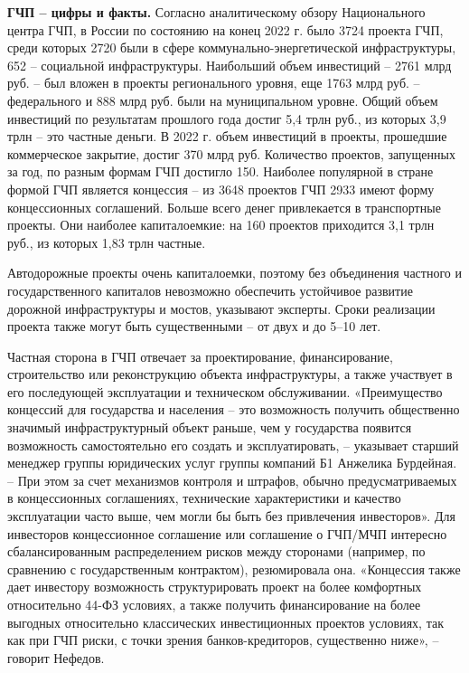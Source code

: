 \begin{fancyquotes}
    \textbf{ГЧП – цифры и факты.} Согласно аналитическому обзору Национального центра ГЧП, в России по состоянию на конец 2022 г. было 3724 проекта ГЧП, среди которых 2720 были в сфере коммунально-энергетической инфраструктуры, 652 – социальной инфраструктуры. Наибольший объем инвестиций – 2761 млрд руб. – был вложен в проекты регионального уровня, еще 1763 млрд руб. – федерального и 888 млрд руб. были на муниципальном уровне. Общий объем инвестиций по результатам прошлого года достиг 5,4 трлн руб., из которых 3,9 трлн – это частные деньги.
    В 2022 г. объем инвестиций в проекты, прошедшие коммерческое закрытие, достиг 370 млрд руб. Количество проектов, запущенных за год, по разным формам ГЧП достигло 150.
    Наиболее популярной в стране формой ГЧП является концессия – из 3648 проектов ГЧП 2933 имеют форму концессионных соглашений. Больше всего денег привлекается в транспортные проекты. Они наиболее капиталоемкие: на 160 проектов приходится 3,1 трлн руб., из которых 1,83 трлн частные.
\end{fancyquotes}



Автодорожные проекты очень капиталоемки, поэтому без объединения частного и государственного капиталов невозможно обеспечить устойчивое развитие дорожной инфраструктуры и мостов, указывают эксперты. Сроки реализации проекта также могут быть существенными – от двух и до 5–10 лет.

Частная сторона в ГЧП отвечает за проектирование, финансирование, строительство или реконструкцию объекта инфраструктуры, а также участвует в его последующей эксплуатации и техническом обслуживании. «Преимущество концессий для государства и населения – это возможность получить общественно значимый инфраструктурный объект раньше, чем у государства появится возможность самостоятельно его создать и эксплуатировать, – указывает старший менеджер группы юридических услуг группы компаний Б1 Анжелика Бурдейная. – При этом за счет механизмов контроля и штрафов, обычно предусматриваемых в концессионных соглашениях, технические характеристики и качество эксплуатации часто выше, чем могли бы быть без привлечения инвесторов». Для инвесторов концессионное соглашение или соглашение о ГЧП/МЧП интересно сбалансированным распределением рисков между сторонами (например, по сравнению с государственным контрактом), резюмировала она. «Концессия также дает инвестору возможность структурировать проект на более комфортных относительно 44-ФЗ условиях, а также получить финансирование на более выгодных относительно классических инвестиционных проектов условиях, так как при ГЧП риски, с точки зрения банков-кредиторов, существенно ниже», – говорит Нефедов.

